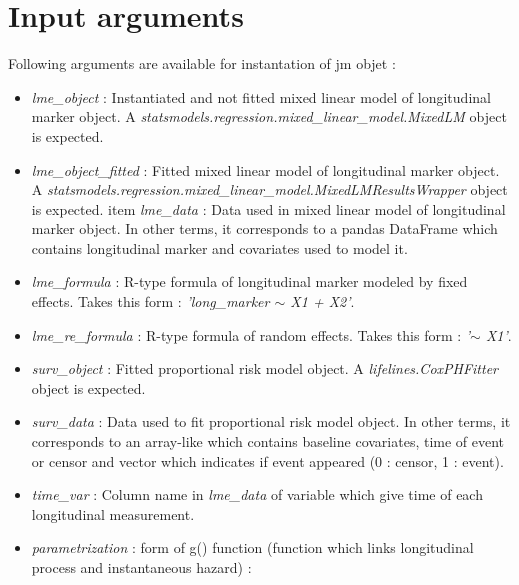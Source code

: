 \documentclass[11pt, oneside]{article}   	%
\providecommand{\tightlist}{%
      \setlength{\itemsep}{0pt}\setlength{\parskip}{0pt}}
\begin{document}







\section{Input arguments}\label{input}

Following arguments are available for instantation of jm objet :

\begin{itemize}
\tightlist
\item
  \emph{lme\_object} : Instantiated and not fitted mixed linear model of longitudinal marker object. A \emph{statsmodels.regression.mixed\_linear\_model.MixedLM} object is expected.
\item
  \emph{lme\_object\_fitted} : Fitted mixed linear model of longitudinal marker object. A \emph{statsmodels.regression.mixed\_linear\_model.MixedLMResultsWrapper} object is expected.
item
  \emph{lme\_data} : Data used in mixed linear model of longitudinal marker object. In other terms, it corresponds to a pandas DataFrame which contains longitudinal marker and covariates used to model it.
\item
  \emph{lme\_formula} : R-type formula of longitudinal marker modeled by fixed effects. Takes this form : \emph{'long\_marker \(\sim\) X1 + X2'}.
\item
  \emph{lme\_re\_formula} : R-type formula of random effects. Takes this form : \emph{'\(\sim\) X1'}.
\item
  \emph{surv\_object} : Fitted proportional risk model object. A \emph{lifelines.CoxPHFitter} object is expected.
\item
  \emph{surv\_data} : Data used to fit proportional risk model object. In other terms, it corresponds to an array-like which contains baseline covariates, time of event or censor and vector which indicates if event appeared (0 : censor, 1 : event).
\item
  \emph{time\_var} : Column name in \emph{lme\_data} of variable which give time of each longitudinal measurement.
\item
  \emph{parametrization} : form of g() function (function which links longitudinal process and instantaneous hazard) :
  

\end{itemize}
\end{document}
